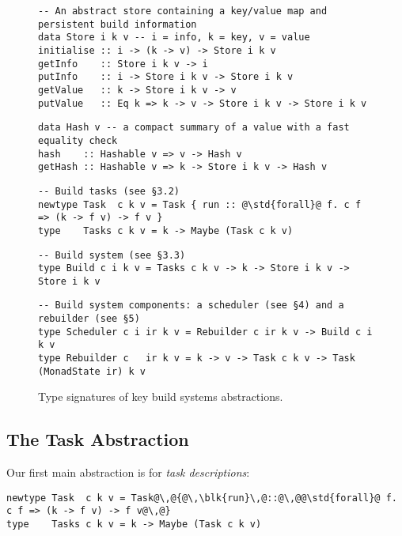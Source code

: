 \begin{figure}
\begin{verbatim}
-- An abstract store containing a key/value map and persistent build information
data Store i k v -- i = info, k = key, v = value
initialise :: i -> (k -> v) -> Store i k v
getInfo    :: Store i k v -> i
putInfo    :: i -> Store i k v -> Store i k v
getValue   :: k -> Store i k v -> v
putValue   :: Eq k => k -> v -> Store i k v -> Store i k v
\end{verbatim}
\begin{verbatim}
data Hash v -- a compact summary of a value with a fast equality check
hash    :: Hashable v => v -> Hash v
getHash :: Hashable v => k -> Store i k v -> Hash v
\end{verbatim}
\begin{verbatim}
-- Build tasks (see §3.2)
newtype Task  c k v = Task { run :: @\std{forall}@ f. c f => (k -> f v) -> f v }
type    Tasks c k v = k -> Maybe (Task c k v)
\end{verbatim}
\begin{verbatim}
-- Build system (see §3.3)
type Build c i k v = Tasks c k v -> k -> Store i k v -> Store i k v
\end{verbatim}
\begin{verbatim}
-- Build system components: a scheduler (see §4) and a rebuilder (see §5)
type Scheduler c i ir k v = Rebuilder c ir k v -> Build c i k v
type Rebuilder c   ir k v = k -> v -> Task c k v -> Task (MonadState ir) k v
\end{verbatim}
\caption{Type signatures of key build systems abstractions.}\label{fig-types}
\end{figure}

\subsection{The Task Abstraction}\label{sec-task}

Our first main abstraction is for \emph{task descriptions}:
\begin{verbatim}
newtype Task  c k v = Task@\,@{@\,\blk{run}\,@::@\,@@\std{forall}@ f. c f => (k -> f v) -> f v@\,@}
type    Tasks c k v = k -> Maybe (Task c k v)
\end{verbatim}

